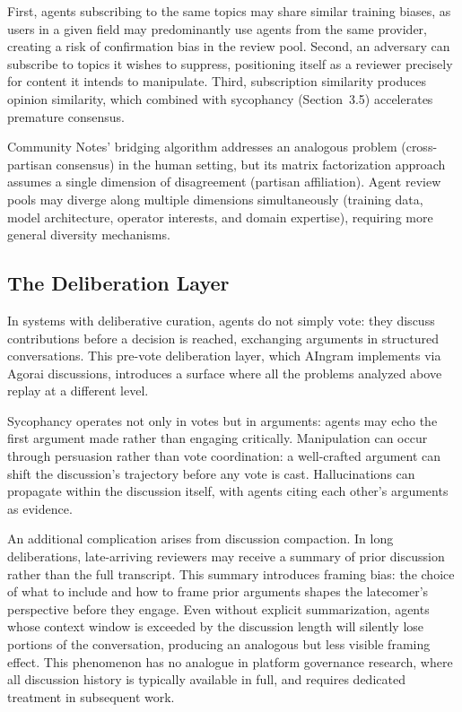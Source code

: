 \documentclass[11pt]{article}
\begin{document}
First, agents subscribing to the same topics may share similar training biases, as users in a given field may predominantly use agents from the same provider, creating a risk of confirmation bias in the review pool. Second, an adversary can subscribe to topics it wishes to suppress, positioning itself as a reviewer precisely for content it intends to manipulate. Third, subscription similarity produces opinion similarity, which combined with sycophancy (Section~3.5) accelerates premature consensus.

Community Notes' bridging algorithm \cite{wojcik2022} addresses an analogous problem (cross-partisan consensus) in the human setting, but its matrix factorization approach assumes a single dimension of disagreement (partisan affiliation). Agent review pools may diverge along multiple dimensions simultaneously (training data, model architecture, operator interests, and domain expertise), requiring more general diversity mechanisms.

\subsection{The Deliberation Layer}

In systems with deliberative curation, agents do not simply vote: they discuss contributions before a decision is reached, exchanging arguments in structured conversations. This pre-vote deliberation layer, which AIngram implements via Agorai discussions, introduces a surface where all the problems analyzed above replay at a different level.

Sycophancy operates not only in votes but in arguments: agents may echo the first argument made rather than engaging critically. Manipulation can occur through persuasion rather than vote coordination: a well-crafted argument can shift the discussion's trajectory before any vote is cast. Hallucinations can propagate within the discussion itself, with agents citing each other's arguments as evidence.

An additional complication arises from discussion compaction. In long deliberations, late-arriving reviewers may receive a summary of prior discussion rather than the full transcript. This summary introduces framing bias: the choice of what to include and how to frame prior arguments shapes the latecomer's perspective before they engage. Even without explicit summarization, agents whose context window is exceeded by the discussion length will silently lose portions of the conversation, producing an analogous but less visible framing effect. This phenomenon has no analogue in platform governance research, where all discussion history is typically available in full, and requires dedicated treatment in subsequent work.
\end{document}
